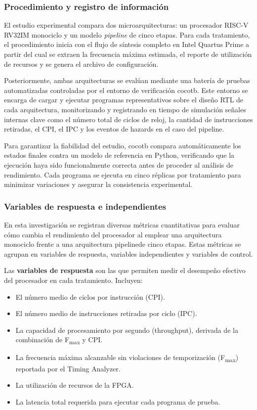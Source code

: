 \subsubsection{Procedimiento y registro de información}

El estudio experimental compara dos microarquitecturas: un procesador RISC-V RV32IM monociclo y un modelo \textit{pipeline} de cinco etapas. Para cada tratamiento, el procedimiento inicia con el flujo de síntesis completo en Intel Quartus Prime a partir del cual se extraen la frecuencia máxima estimada, el reporte de utilización de recursos y se genera el archivo de configuración. 

Posteriormente, ambas arquitecturas se evalúan mediante una batería de pruebas automatizadas controladas por el entorno de verificación cocotb. Este entorno se encarga de cargar y ejecutar programas representativos sobre el diseño RTL de cada arquitectura, monitorizando y registrando en tiempo de simulación señales internas clave como el número total de ciclos de reloj, la cantidad de instrucciones retiradas, el CPI, el IPC y los eventos de hazards en el caso del pipeline. 

Para garantizar la fiabilidad del estudio, cocotb compara automáticamente los estados finales contra un modelo de referencia en Python, verificando que la ejecución haya sido funcionalmente correcta antes de proceder al análisis de rendimiento. Cada programa se ejecuta en cinco réplicas por tratamiento para minimizar variaciones y asegurar la consistencia experimental.

\subsubsection{Variables de respuesta e independientes}

En esta investigación se registran diversas métricas cuantitativas para evaluar cómo cambia el rendimiento del procesador al emplear una arquitectura monociclo frente a una arquitectura pipelinede cinco etapas. Estas métricas se agrupan en variables de respuesta, variables independientes y variables de control.

Las \textbf{variables de respuesta} son las que permiten medir el desempeño efectivo del procesador en cada tratamiento. Incluyen:
\begin{itemize}
    \item El número medio de ciclos por instrucción (CPI).
    \item El número medio de instrucciones retiradas por ciclo (IPC).
    \item La capacidad de procesamiento por segundo (throughput), derivada de la combinación de F\textsubscript{max} y CPI.
    \item La frecuencia máxima alcanzable sin violaciones de temporización (F\textsubscript{max}) reportada por el Timing Analyzer.
    \item La utilización de recursos de la FPGA.
    \item La latencia total requerida para ejecutar cada programa de prueba.
\end{itemize}

